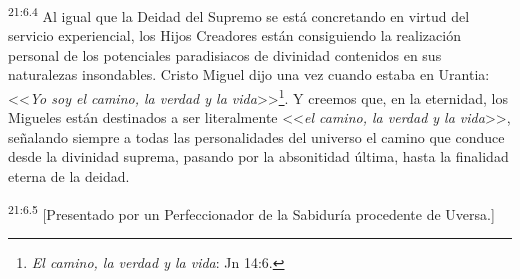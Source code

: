 \par
\textsuperscript{21:6.4} Al igual que la Deidad del Supremo se está concretando en virtud del servicio experiencial, los Hijos Creadores están consiguiendo la realización personal de los potenciales paradisiacos de divinidad contenidos en sus naturalezas insondables. Cristo Miguel dijo una vez cuando estaba en Urantia: <<\textit{Yo soy el camino, la verdad y la vida}>>\footnote{\textit{El camino, la verdad y la vida}: Jn 14:6.}. Y creemos que, en la eternidad, los Migueles están destinados a ser literalmente <<\textit{el camino, la verdad y la vida}>>, señalando siempre a todas las personalidades del universo el camino que conduce desde la divinidad suprema, pasando por la absonitidad última, hasta la finalidad eterna de la deidad.

\par
\textsuperscript{21:6.5} [Presentado por un Perfeccionador de la Sabiduría procedente de Uversa.]